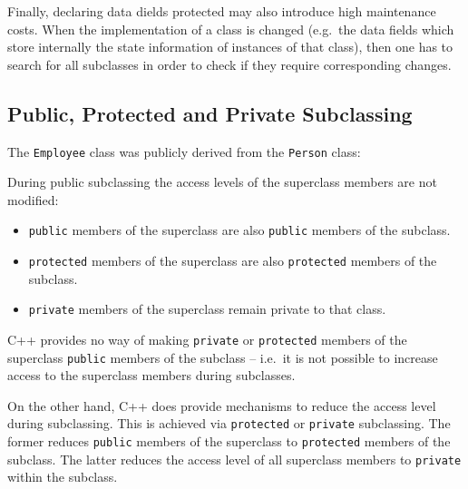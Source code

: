 \noindent {\small }


Finally, declaring data dields protected may also introduce high maintenance costs. When
the implementation of a class is changed (e.g.\ the data fields which store internally
the state information of instances of that class), then one has to search for all
subclasses in order to check if they require corresponding changes.


\subsection{Public, Protected and Private Subclassing}

The \verb+Employee+ class was publicly derived from the \verb+Person+
class:


During public subclassing the access levels of the superclass members
are not modified:
\begin{itemize}
  \item \verb+public+ members of the superclass are also \verb+public+
         members of the subclass.
  \item \verb+protected+ members of the superclass are also \verb+protected+
         members of the subclass.
  \item \verb+private+ members of the superclass remain private to that class.         
\end{itemize}

C++ provides no way of making \verb+private+ or \verb+protected+ members of 
the superclass \verb+public+ members of the subclass -- i.e.\ it is not 
possible to increase access to the superclass members during subclasses. 

On the other hand, C++ does provide mechanisms to reduce the access level 
during subclassing. This is achieved via \verb+protected+ or \verb+private+
subclassing. The former reduces \verb+public+ members of the superclass to 
\verb+protected+ members of the subclass. The latter reduces the access level
of all superclass members to \verb+private+ within the subclass.

